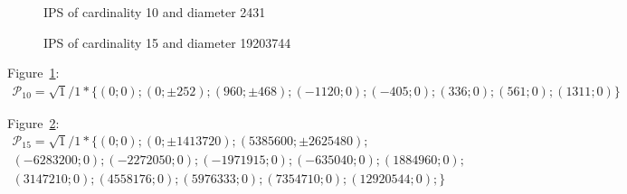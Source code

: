 \documentclass[12pt]{article}
\theoremstyle{theorem}
\theoremstyle{dfn}
\theoremstyle{remark}
\begin{document}
\begin{figure}[h!]
	\parbox{1\linewidth}{\caption{IPS of cardinality 10 and diameter 2431}
	\label{10_2431_1_0606}}
\end{figure}


\begin{figure}[h!]
	\parbox{1\linewidth}{\caption{IPS of cardinality 15 and diameter 19203744}
	\label{15_19203744_1_80db}}
\end{figure}

Figure~\ref{10_2431_1_0606}:
\begin{multline*}
	\mathcal{P}_{10} =
	\sqrt{1}/1*\{
		( 0 ; 0);
		( 0 ; \pm252);
		( 960 ; \pm468);
		( -1120 ; 0);
		( -405 ; 0);
		( 336 ; 0);
		( 561 ; 0);
		( 1311 ; 0)
	\}
\end{multline*}

Figure~\ref{15_19203744_1_80db}:
\begin{multline*}
	\mathcal{P}_{15} =
	\sqrt{1}/1*\{
		( 0 ; 0);
		( 0 ; \pm1413720);
		( 5385600 ; \pm2625480);
		\\
		( -6283200 ; 0);
		( -2272050 ; 0);
		( -1971915 ; 0);
		( -635040 ; 0);
		( 1884960 ; 0);
		\\
		( 3147210 ; 0);
		( 4558176 ; 0);
		( 5976333 ; 0);
		( 7354710 ; 0);
		( 12920544 ; 0);
	\}
\end{multline*}
\end{document}
